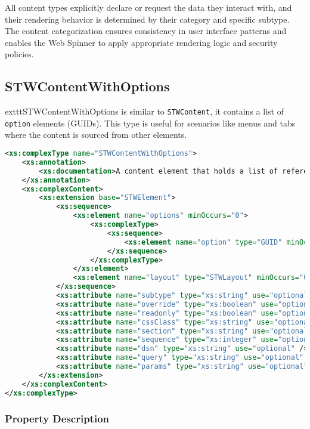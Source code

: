 All content types explicitly declare or request the data they interact with, and their rendering behavior is determined by their category and specific subtype. The content categorization ensures consistency in user interface patterns and enables the Web Spinner to apply appropriate rendering logic and security policies.

\subsection{STWContentWithOptions}

	exttt{STWContentWithOptions} is similar to \texttt{STWContent}, it contains a list of \texttt{option} elements (GUIDs). This type is useful for scenarios like menus and tabs where the content is sourced from other elements.

\begin{lstlisting}[language=XML,caption={STWContentWithOptions Type Definition}]
<xs:complexType name="STWContentWithOptions">
	<xs:annotation>
		<xs:documentation>A content element that holds a list of references (options) to other STWElements, instead of nested child elements. Useful for menus and tabs where content is sourced from elsewhere.</xs:documentation>
	</xs:annotation>
	<xs:complexContent>
		<xs:extension base="STWElement">
			<xs:sequence>
				<xs:element name="options" minOccurs="0">
					<xs:complexType>
						<xs:sequence>
							<xs:element name="option" type="GUID" minOccurs="0" maxOccurs="unbounded" />
						</xs:sequence>
					</xs:complexType>
				</xs:element>
				<xs:element name="layout" type="STWLayout" minOccurs="0" />
			</xs:sequence>
			<xs:attribute name="subtype" type="xs:string" use="optional" />
			<xs:attribute name="override" type="xs:boolean" use="optional" />
			<xs:attribute name="readonly" type="xs:boolean" use="optional" />
			<xs:attribute name="cssClass" type="xs:string" use="optional" />
			<xs:attribute name="section" type="xs:string" use="optional" />
			<xs:attribute name="sequence" type="xs:integer" use="optional" />
			<xs:attribute name="dsn" type="xs:string" use="optional" />
			<xs:attribute name="query" type="xs:string" use="optional" />
			<xs:attribute name="params" type="xs:string" use="optional" />
		</xs:extension>
	</xs:complexContent>
</xs:complexType>
\end{lstlisting}

\subsubsection{Property Description}

